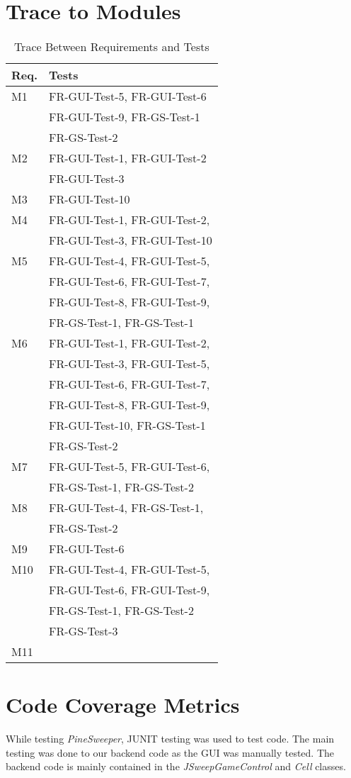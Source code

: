 \documentclass[12pt, titlepage]{article}
\begin{document}
\newpage
\section{Trace to Modules}
\begin{table}[H]
\centering
\begin{tabular}{p{} p{}}
\toprule
\textbf{Req.} & \textbf{Tests}\\
\midrule
M1 & FR-GUI-Test-5, FR-GUI-Test-6\\
      & FR-GUI-Test-9, FR-GS-Test-1\\
      & FR-GS-Test-2\\
M2 & FR-GUI-Test-1, FR-GUI-Test-2\\
      & FR-GUI-Test-3\\
M3 & FR-GUI-Test-10\\
M4 & FR-GUI-Test-1, FR-GUI-Test-2, \\
       & FR-GUI-Test-3, FR-GUI-Test-10\\
M5 & FR-GUI-Test-4, FR-GUI-Test-5, \\
       & FR-GUI-Test-6, FR-GUI-Test-7, \\
       & FR-GUI-Test-8, FR-GUI-Test-9, \\
       & FR-GS-Test-1, FR-GS-Test-1\\
M6 & FR-GUI-Test-1, FR-GUI-Test-2, \\
      & FR-GUI-Test-3, FR-GUI-Test-5, \\
      & FR-GUI-Test-6, FR-GUI-Test-7, \\
      & FR-GUI-Test-8, FR-GUI-Test-9, \\
      & FR-GUI-Test-10, FR-GS-Test-1\\
      & FR-GS-Test-2\\
M7 & FR-GUI-Test-5, FR-GUI-Test-6, \\
      & FR-GS-Test-1, FR-GS-Test-2\\
M8 & FR-GUI-Test-4, FR-GS-Test-1, \\
       & FR-GS-Test-2\\
M9 & FR-GUI-Test-6 \\
M10 & FR-GUI-Test-4, FR-GUI-Test-5,\\
	& FR-GUI-Test-6, FR-GUI-Test-9, \\
	& FR-GS-Test-1, FR-GS-Test-2\\
	& FR-GS-Test-3\\
M11 & \\
\bottomrule
\end{tabular}
\caption{Trace Between Requirements and Tests}
\label{TblRT}
\end{table}

\newpage	
\section{Code Coverage Metrics}
While testing \textit{PineSweeper}, JUNIT testing was used to test code. The main testing was done to our backend code as the
GUI was manually tested. The backend code is mainly contained in the \textit{JSweepGameControl} and \textit{Cell} classes.



\end{document}
